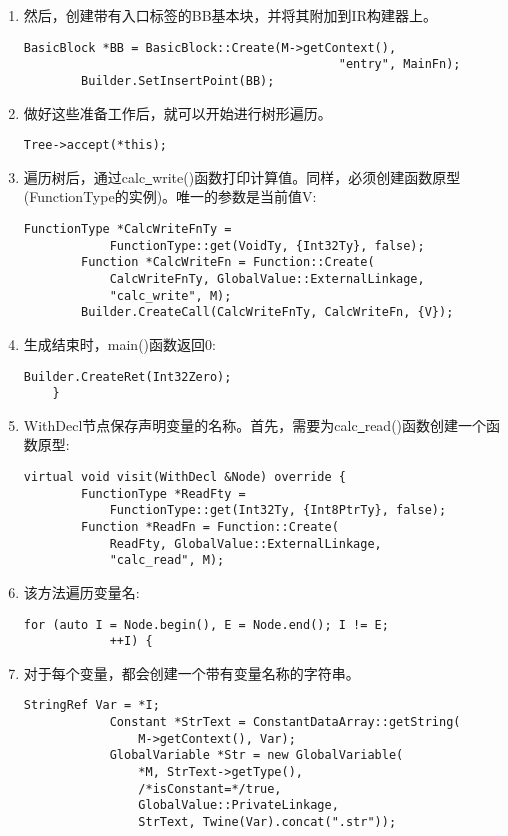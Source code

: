 \begin{enumerate}
\item 然后，创建带有入口标签的BB基本块，并将其附加到IR构建器上。
\begin{lstlisting}[caption={}]
		BasicBlock *BB = BasicBlock::Create(M->getContext(),
											"entry", MainFn);
		Builder.SetInsertPoint(BB);
\end{lstlisting}

\item 做好这些准备工作后，就可以开始进行树形遍历。
\begin{lstlisting}[caption={}]
		Tree->accept(*this);
\end{lstlisting}

\item 遍历树后，通过calc\underline{~}write()函数打印计算值。同样，必须创建函数原型(FunctionType的实例)。唯一的参数是当前值V:
\begin{lstlisting}[caption={}]
		FunctionType *CalcWriteFnTy =
			FunctionType::get(VoidTy, {Int32Ty}, false);
		Function *CalcWriteFn = Function::Create(
			CalcWriteFnTy, GlobalValue::ExternalLinkage,
			"calc_write", M);
		Builder.CreateCall(CalcWriteFnTy, CalcWriteFn, {V});
\end{lstlisting}

\item 生成结束时，main()函数返回0:
\begin{lstlisting}[caption={}]
		Builder.CreateRet(Int32Zero);
	}
\end{lstlisting}

\item WithDecl节点保存声明变量的名称。首先，需要为calc\underline{~}read()函数创建一个函数原型:
\begin{lstlisting}[caption={}]
	virtual void visit(WithDecl &Node) override {
		FunctionType *ReadFty =
			FunctionType::get(Int32Ty, {Int8PtrTy}, false);
		Function *ReadFn = Function::Create(
			ReadFty, GlobalValue::ExternalLinkage,
			"calc_read", M);
\end{lstlisting}

\item 该方法遍历变量名:
\begin{lstlisting}[caption={}]
		for (auto I = Node.begin(), E = Node.end(); I != E;
			++I) {
\end{lstlisting}

\item 对于每个变量，都会创建一个带有变量名称的字符串。
\begin{lstlisting}[caption={}]
			StringRef Var = *I;
			Constant *StrText = ConstantDataArray::getString(
				M->getContext(), Var);
			GlobalVariable *Str = new GlobalVariable(
				*M, StrText->getType(),
				/*isConstant=*/true,
				GlobalValue::PrivateLinkage,
				StrText, Twine(Var).concat(".str"));
\end{lstlisting}


\end{enumerate}
